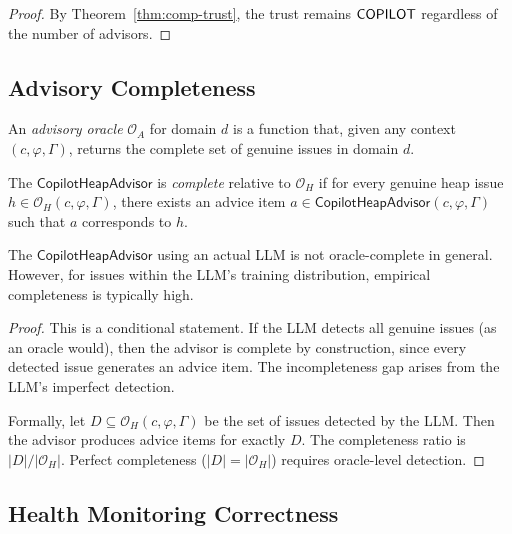 \documentclass[11pt]{article}
\newcommand{\HeapAdv}{\mathsf{CopilotHeapAdvisor}}
\begin{document}
\begin{proof}
By Theorem~\ref{thm:comp-trust}, the trust remains $\mathsf{COPILOT}$
regardless of the number of advisors.
\end{proof}

\subsection{Advisory Completeness}
\label{sec:formal:completeness}

\begin{definition}
\label{def:adv-oracle}
An \emph{advisory oracle} $\mathcal{O}_A$ for domain $d$ is a
function that, given any context $(c, \varphi, \Gamma)$, returns
the complete set of genuine issues in domain $d$.
\end{definition}

\begin{theorem}
\label{thm:completeness}
The $\HeapAdv$ is \emph{complete} relative to $\mathcal{O}_H$
if for every genuine heap issue $h \in \mathcal{O}_H(c, \varphi, \Gamma)$,
there exists an advice item $a \in \HeapAdv(c, \varphi, \Gamma)$
such that $a$ corresponds to $h$.

The $\HeapAdv$ using an actual LLM is not oracle-complete in
general.  However, for issues within the LLM's training
distribution, empirical completeness is typically high.
\end{theorem}

\begin{proof}
This is a conditional statement.  If the LLM detects all genuine
issues (as an oracle would), then the advisor is complete by
construction, since every detected issue generates an advice item.
The incompleteness gap arises from the LLM's imperfect detection.

Formally, let $D \subseteq \mathcal{O}_H(c, \varphi, \Gamma)$ be
the set of issues detected by the LLM.  Then the advisor produces
advice items for exactly $D$.  The completeness ratio is
$|D|/|\mathcal{O}_H|$.  Perfect completeness ($|D| = |\mathcal{O}_H|$)
requires oracle-level detection.
\end{proof}

\subsection{Health Monitoring Correctness}
\label{sec:formal:health}
\end{document}
